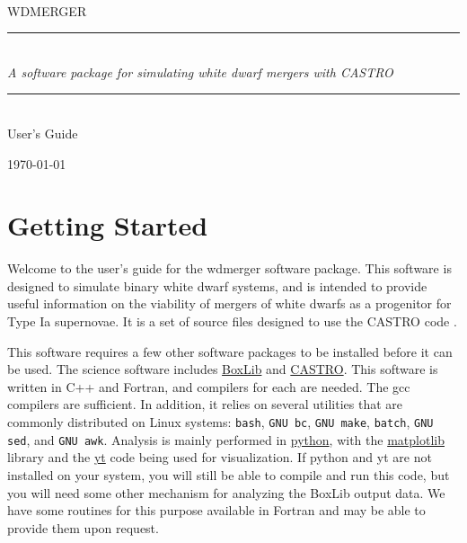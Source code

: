 \documentclass[12pt]{book}
\newcommand{\HRule}{\rule{\linewidth}{0.125mm}}
\begin{document}
\frontmatter

\begin{titlepage}
\begin{center}
\ \\[3in]
{\sf \Huge WDMERGER} 

\begin{minipage}{5.5in}
\HRule\\[2mm]
\centering
{\Large \em A software package for simulating white dwarf mergers with CASTRO}

\HRule
\end{minipage}

\ \\[1 in]
{\sf \huge User's Guide}

\vfill

{\large \today}
\end{center}

\end{titlepage}



\tableofcontents

\mainmatter

\chapter{Getting Started}

Welcome to the user's guide for the wdmerger software package. This software is designed to
simulate binary white dwarf systems, and is intended to provide useful information on the 
viability of mergers of white dwarfs as a progenitor for Type Ia supernovae. It is a set of 
source files designed to use the CASTRO code \citep{castro}.

This software requires a few other software packages to be installed before it can be used.
The science software includes \href{https://ccse.lbl.gov/BoxLib/}{BoxLib} and 
\href{https://ccse.lbl.gov/Downloads/downloadCASTRO.html}{CASTRO}. This software is written 
in C++ and Fortran, and compilers for each are needed. The gcc compilers are sufficient.
In addition, it relies on several utilities that are 
commonly distributed on Linux systems: \texttt{bash}, \texttt{GNU bc}, \texttt{GNU make}, 
\texttt{batch}, \texttt{GNU sed}, and \texttt{GNU awk}. Analysis is mainly performed in 
\href{https://www.python.org/}{python}, with the \href{http://matplotlib.org/}{matplotlib} 
library and the \href{http://yt-project.org/}{yt} code being used for visualization. 
If python and yt are not installed on your system, you will still be able to compile and 
run this code, but you will need some other mechanism for analyzing the BoxLib output data.
We have some routines for this purpose available in Fortran and may be able to provide them
upon request.
\end{document}
